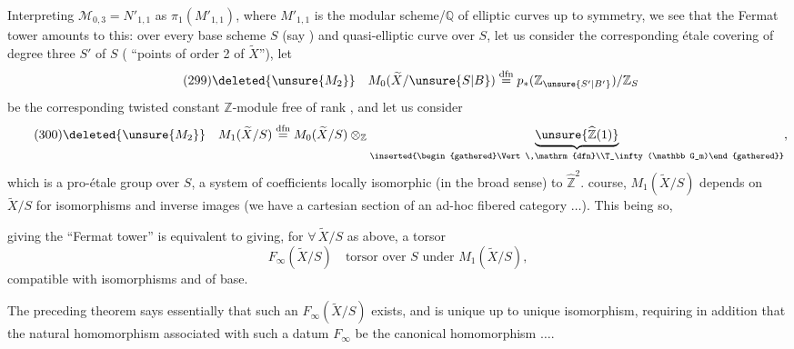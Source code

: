 Interpreting $\mathcal M_{0,3}=N'_{1,1}$ as $\pi_1(M'_{1,1})$, where $M'_{1,1}$ is the modular scheme/$\mathbb Q$ of elliptic curves up to symmetry, we see that the Fermat tower amounts to this: over every base scheme $S$ (say ) and  quasi-elliptic curve  over $S$, let us consider the corresponding étale covering of degree three $S'$ of $S$ ( ``points of order 2 of $\widetilde X$''),  let
\[
\tag{299}
\deleted{\unsure{M_2}}\quad M_0(\widetilde X/\unsure{S|B})\overset{\mathrm{dfn}}{=}p_*(\mathbb Z_{\unsure{S'|B'}})/\mathbb Z_S
\]
be the corresponding twisted constant $\mathbb Z$-module free of rank , and let us consider
\[
\tag{300}
\deleted{\unsure{M_2}}\quad M_1(\widetilde X/S)\overset{\mathrm{dfn}}{=}M_0(\widetilde X/S)\otimes_{\mathbb Z}\underbrace{\unsure{\widehat{\mathbb Z}(1)}}_{\inserted{\begin{gathered}\Vert\,\mathrm{dfn}\\T_\infty(\mathbb G_m)\end{gathered}}},
\]
which is a pro-étale group over $S$, a system of coefficients locally isomorphic (in the broad sense) to $\widehat{\mathbb Z}^{2}$.  course, $M_1(\widetilde X/S)$ depends  on $\widetilde X/S$ for isomorphisms and inverse images (we have a cartesian section of an ad-hoc fibered category $\ldots$). This being so,



giving the ``Fermat tower'' is equivalent to giving, for $\forall\,\widetilde X/S$ as above, a torsor
\[
\tag{301}
F_\infty(\widetilde X/S)\quad\text{torsor over }S\text{ under }M_1(\widetilde X/S),
\]
compatible with isomorphisms and  of base.

The preceding theorem says essentially that such an $F_\infty(\widetilde X/S)$ exists, and is unique up to unique isomorphism, requiring in addition that the natural homomorphism
associated with such a datum $F_\infty$ be the canonical homomorphism $\ldots$.

